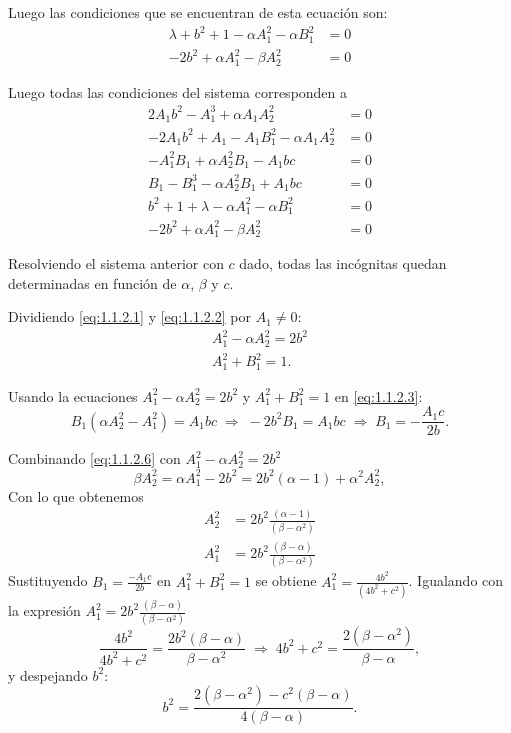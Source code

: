 \documentclass[letterpaper,11pt]{exam}
\theoremstyle{plain}
\begin{document}
Luego las condiciones que se encuentran de esta ecuación son:
\begin{align*}
\lambda+b^2+1-\alpha A_1^2-\alpha B_1^2&=0\\
-2b^2+\alpha A_1^2-\beta A_2^2&=0
\end{align*}


Luego todas las condiciones del sistema corresponden a
\begin{align}
    2A_1b^2-A_1^3+\alpha A_1A_2^2&=0 \label{eq:1.1.2.1}\\
    -2A_1b^2+A_1-A_1B_1^2-\alpha A_1A_2^2&=0 \label{eq:1.1.2.2}\\
    -A_1^2B_1+\alpha A_2^2B_1-A_1bc&=0\label{eq:1.1.2.3}\\
    B_1-B_1^3-\alpha A_2^2B_1+A_1bc&=0 \label{eq:1.1.2.4}\\
    b^2+1+\lambda -\alpha A_1^2-\alpha B_1^2&=0 \label{eq:1.1.2.5}\\
    -2b^2+\alpha A_1^2-\beta A_2^2&=0 \label{eq:1.1.2.6}
\end{align}

Resolviendo el sistema anterior con $c$ dado, todas las incógnitas quedan determinadas en función de $\alpha$, $\beta$ y $c$.
 
\medskip
Dividiendo \eqref{eq:1.1.2.1} y \eqref{eq:1.1.2.2}
por $A_1\neq 0$:
\begin{align*}
    A_1^2 - \alpha A_2^2 = 2b^2 \\
    A_1^2 + B_1^2 = 1.
\end{align*}
 
Usando la ecuaciones $ A_1^2 - \alpha A_2^2 = 2b^2$ y $A_1^2 + B_1^2 = 1$ en \eqref{eq:1.1.2.3}:
\begin{equation*}
    B_1(\alpha A_2^2 - A_1^2) = A_1 bc
    \;\Longrightarrow\;
    -2b^2 B_1 = A_1 bc
    \;\Longrightarrow\;
    B_1 = -\frac{A_1 c}{2b}.
\end{equation*}

 
 Combinando \eqref{eq:1.1.2.6} con $A_1^2 - \alpha A_2^2 = 2b^2$
\begin{equation*}
    \beta A_2^2 = \alpha A_1^2 - 2b^2 = 2b^2(\alpha-1) + \alpha^2 A_2^2,
\end{equation*}
Con lo que obtenemos 
\begin{align*}
A_2^2 &= 2b^2\frac{(\alpha-1)}{(\beta-\alpha^2)} \\
A_1^2 &= 2b^2\frac{(\beta-\alpha)}{(\beta-\alpha^2)}
\end{align*}
\medskip
Sustituyendo $B_1 = \frac{-A_1c}{2b}$ en $A_1^2+B_1^2=1$
se obtiene $A_1^2 = \frac{4b^2}{(4b^2+c^2)}$. Igualando con la expresión $A_1^2 = 2b^2\frac{(\beta-\alpha)}{(\beta-\alpha^2)}$
\begin{equation*}
    \frac{4b^2}{4b^2+c^2} = \frac{2b^2(\beta-\alpha)}{\beta-\alpha^2}
    \;\Longrightarrow\;
    4b^2+c^2 = \frac{2(\beta-\alpha^2)}{\beta-\alpha},
\end{equation*}
y despejando $b^2$:
\begin{equation}
    b^2 = \frac{2(\beta-\alpha^2)-c^2(\beta-\alpha)}{4(\beta-\alpha)}.
    \label{eq:b2final}
\end{equation}
 
\end{document}
